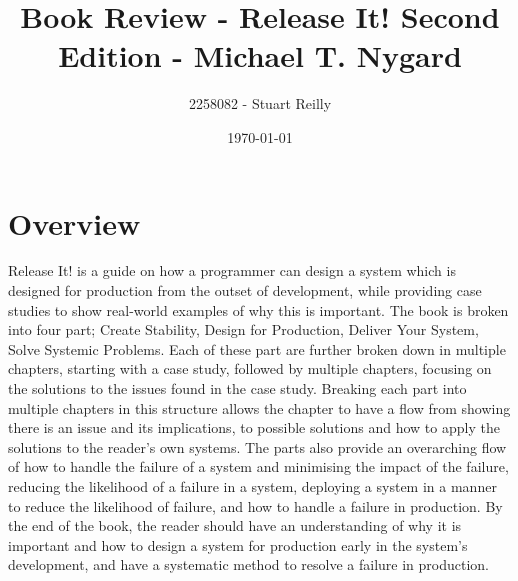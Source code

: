 \documentclass[11pt]{article}
\begin{document}
\title{Book Review - Release It! Second Edition - Michael T. Nygard}

\author{2258082 - Stuart Reilly}

\date{\today}

\maketitle

\section{Overview}
Release It! is a guide on how a programmer can design a system which is designed for production 
from the outset of development, while providing case studies to show real-world examples of why
this is important.
The book is broken into four part; Create Stability, Design for Production, Deliver Your 
System, Solve Systemic Problems.
Each of these part are further broken down in multiple chapters, starting with a case study,
followed by multiple chapters, focusing on the solutions to the issues found in the case study.
Breaking each part into multiple chapters in this structure allows the chapter to have a flow
from showing there is an issue and its implications, to possible solutions and how to apply the
solutions to the reader's own systems.
The parts also provide an overarching flow of how to handle the failure of a system and 
minimising the impact of the failure, reducing the likelihood of a failure in a system,
deploying a system in a manner to reduce the likelihood of failure, and how to handle a failure
in production.
By the end of the book, the reader should have an understanding of why it is important and how to 
design a system for production early in the system's development, and have a systematic method to 
resolve a failure in production.
\end{document}
